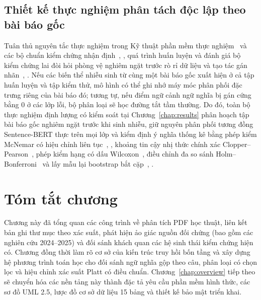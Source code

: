 \subsection{Thiết kế thực nghiệm phân tách độc lập theo bài báo gốc}

Tuân thủ nguyên tắc thực nghiệm trong Kỹ thuật phần mềm thực nghiệm~\cite{wohlin2012experimentation} và các bộ chuẩn kiểm chứng nhận định~\cite{thorne2018fever}, \cite{wadden2020scifact}, quá trình huấn luyện và đánh giá bộ kiểm chứng lai đòi hỏi phòng vệ nghiêm ngặt trước rò rỉ dữ liệu và tạo tác gán nhãn~\cite{gururangan2018annotation}, \cite{poliak2018hypothesis}. Nếu các biến thể nhiễu sinh từ cùng một bài báo gốc xuất hiện ở cả tập huấn luyện và tập kiểm thử, mô hình có thể ghi nhớ máy móc phân phối đặc trưng riêng của bài báo đó; tương tự, nếu điểm ngữ cảnh ngữ nghĩa bị gán cứng bằng $0$ ở các lớp lỗi, bộ phân loại sẽ học đường tắt tầm thường. Do đó, toàn bộ thực nghiệm định lượng có kiểm soát tại Chương~\ref{chap:results} phân hoạch tập bài báo gốc nghiêm ngặt trước khi sinh nhiễu, giữ nguyên phân phối tương đồng Sentence-BERT thực trên mọi lớp và kiểm định ý nghĩa thống kê bằng phép kiểm McNemar có hiệu chỉnh liên tục~\cite{mcnemar1947}, \cite{dietterich1998approximate}, khoảng tin cậy nhị thức chính xác Clopper--Pearson~\cite{clopper1934}, phép kiểm hạng có dấu Wilcoxon~\cite{wilcoxon1945}, điều chỉnh đa so sánh Holm--Bonferroni~\cite{holm1979simple} và lấy mẫu lại bootstrap bắt cặp~\cite{bergkirkpatrick2012empirical}, \cite{dror2018hitchhiker}.

\section{Tóm tắt chương}

Chương này đã tổng quan các công trình về phân tích PDF học thuật, liên kết bản ghi thư mục theo xác suất, phát hiện ảo giác nguồn đối chứng (bao gồm các nghiên cứu 2024--2025) và đối sánh khách quan các hệ sinh thái kiểm chứng hiện có. Chương đồng thời làm rõ cơ sở của kiến trúc truy hồi bốn tầng và xây dựng hệ phương trình toán học cho đối sánh ngữ nghĩa gộp theo câu, phân loại có chọn lọc và hiệu chỉnh xác suất Platt có điều chuẩn. Chương~\ref{chap:overview} tiếp theo sẽ chuyển hóa các nền tảng này thành đặc tả yêu cầu phần mềm hình thức, các sơ đồ UML 2.5, lược đồ cơ sở dữ liệu 15 bảng và thiết kế bảo mật triển khai.

